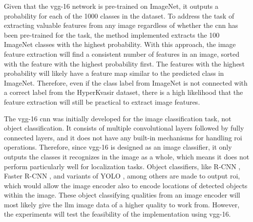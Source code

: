        Given that the \gls{vgg}-16 network is pre-trained on ImageNet, it outputs a probability for each of the 1000 classes in the dataset. To address the task of extracting valuable features from any image regardless of whether the \gls{cnn} has been pre-trained for the task, the method implemented extracts the 100 ImageNet classes with the highest probability. With this approach, the image feature extraction will find a consistent number of features in an image, sorted with the feature with the highest probability first. The features with the highest probability will likely have a feature map similar to the predicted class in ImageNet. Therefore, even if the class label from ImageNet is not connected with a correct label from the HyperKvasir dataset, there is a high likelihood that the feature extraction will still be practical to extract image features.

        The \gls{vgg}-16 \gls{cnn} was initially developed for the image classification task, not object classification. It consists of multiple convolutional layers followed by fully connected layers, and it does not have any built-in mechanisms for handling \gls{roi} operations. 
        Therefore, since \gls{vgg}-16 is designed as an image classifier, it only outputs the classes it recognizes in the image as a whole, which means it does not perform particularly well for localization tasks. Object classifiers, like R-CNN \cite{girshickRichFeatureHierarchies2014}, Faster R-CNN \cite{renFasterRCNNRealTime2015}, and variants of YOLO \cite{redmonYouOnlyLook2016, redmonYOLO9000BetterFaster2016, redmonYOLOv3IncrementalImprovement2018, bochkovskiyYOLOv4OptimalSpeed2020, jocherYolov5, liYOLOv6SingleStageObject2022, wangYOLOv7TrainableBagoffreebies2022, jocherYOLOUltralytics2023}, among others are made to output \gls{roi}, which would allow the image encoder also to encode locations of detected objects within the image. These object classifying qualities from an image encoder will most likely give the \gls{llm} image data of a higher quality to work from. However, the experiments will test the feasibility of the implementation using \gls{vgg}-16.


        
